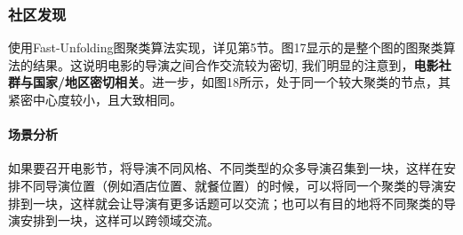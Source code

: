 \documentclass[UTF8, onecolumn, a4paper]{article}
\begin{document}
\subsubsection{社区发现}
    使用Fast-Unfolding图聚类算法实现，详见第5节。图17显示的是整个图的图聚类算法的结果。这说明电影的导演之间合作交流较为密切, 我们明显的注意到，\textbf{电影社群与国家/地区密切相关}。进一步，如图18所示，处于同一个较大聚类的节点，其紧密中心度较小，且大致相同。
 
    \paragraph{场景分析} 如果要召开电影节，将导演不同风格、不同类型的众多导演召集到一块，这样在安排不同导演位置（例如酒店位置、就餐位置）的时候，可以将同一个聚类的导演安排到一块，这样就会让导演有更多话题可以交流；也可以有目的地将不同聚类的导演安排到一块，这样可以跨领域交流。
\end{document}
